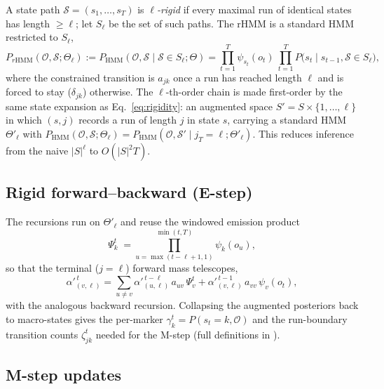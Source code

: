 \documentclass[11pt]{article}
\newcommand{\Oo}{\mathcal{O}}
\newcommand{\Ss}{\mathcal{S}}
\newcommand{\Sr}{S_\ell}
\begin{document}
A state path $\Ss=(s_1,\dots,s_T)$ is \emph{$\ell$-rigid} if every maximal run of
identical states has length $\ge \ell$; let $\Sr$ be the set of such paths. The rHMM is
a standard HMM restricted to $\Sr$,
\begin{equation}
P_{r\mathrm{HMM}}(\Oo,\Ss;\Theta_\ell):=P_{\mathrm{HMM}}(\Oo,\Ss\mid \Ss\in\Sr;\Theta)
=\prod_{t=1}^{T}\psi_{s_t}(o_t)\ \prod_{t=1}^{T}P\!\big(s_t\mid s_{t-1},\Ss\in\Sr\big),
\label{eq:rhmm}
\end{equation}
where the constrained transition is $a_{jk}$ once a run has reached length $\ell$ and is
forced to stay ($\delta_{jk}$) otherwise. The $\ell$-th-order chain is made first-order
by the same state expansion as Eq.~\eqref{eq:rigidity}: an augmented space
$S'=S\times\{1,\dots,\ell\}$ in which $(s,j)$ records a run of length $j$ in state $s$,
carrying a standard HMM $\Theta'_\ell$ with $P_{\mathrm{HMM}}(\Oo,\Ss;\Theta_\ell)=
P_{\mathrm{HMM}}(\Oo,\Ss'\mid j_T=\ell;\Theta'_\ell)$. This reduces inference from the
naive $|S|^\ell$ to $O(|S|^2 T)$.

\subsection{Rigid forward--backward (E-step)}
\label{sec:rhmm-estep}

The recursions run on $\Theta'_\ell$ and reuse the windowed emission product
\begin{equation}
\Psi^{t}_k \;=\!\!\prod_{u=\max(t-\ell+1,1)}^{\min(t,T)}\!\!\psi_k(o_u),
\label{eq:psiwindow}
\end{equation}
so that the terminal ($j=\ell$) forward mass telescopes,
\begin{equation}
\alpha'^{\,t}_{(v,\ell)}=\sum_{u\ne v}\alpha'^{\,t-\ell}_{(u,\ell)}\,a_{uv}\,\Psi^{t}_v
+\alpha'^{\,t-1}_{(v,\ell)}\,a_{vv}\,\psi_v(o_t),
\label{eq:fwd}
\end{equation}
with the analogous backward recursion. Collapsing the augmented posteriors back to
macro-states gives the per-marker $\gamma^t_k=P(s_t=k,\Oo)$ and the run-boundary
transition counts $\zeta^t_{jk}$ needed for the M-step (full definitions in
\citealp{rtiger_2023}).

\subsection{M-step updates}
\label{sec:rhmm-mstep}
\end{document}
